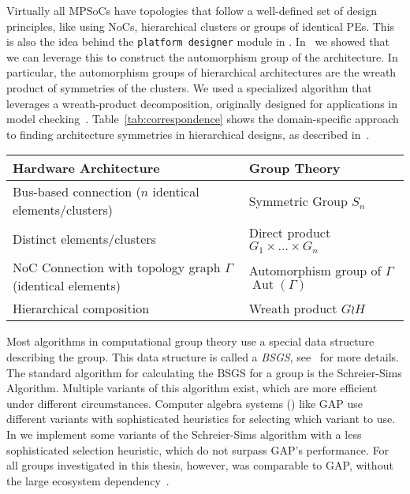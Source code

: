 Virtually all \acp{MPSoC} have topologies that follow a well-defined set of design principles, like using \acp{NoC}, hierarchical clusters or groups of identical \acp{PE}.
This is also the idea behind the \texttt{platform designer} module in \mocasin.
In~\cite{goens_tcad21} we showed that we can leverage this to construct the automorphism group of the architecture.
In particular, the automorphism groups of hierarchical architectures are the wreath product of symmetries of the clusters.
We used a specialized algorithm that leverages a wreath-product decomposition, originally designed for applications in model checking~\cite{donaldson2009constructive}.
Table~\ref{tab:correspondence} shows the domain-specific approach to finding architecture symmetries in hierarchical designs, as described in~\cite{goens_tcad21}.

\begin{table*}[t]
   \caption{Correspondence of architecture and group-theoretic constructions. Adapted from Table~1 in~\cite{goens_tcad21}.}
     \label{tab:correspondence}
   \begin{center}
     \begin{tabularx}{\textwidth}{XX}
       Hardware Architecture & Group Theory \\
       \hline
       \rowcolor{gray!15}
       Bus-based connection ($n$ identical elements/clusters) & Symmetric Group $S_n$ \\
       Distinct elements/clusters & Direct product $G_1 \times \ldots \times G_n$ \\
       \rowcolor{gray!15}
       \ac{NoC} Connection with topology graph $\Gamma$ (identical elements) & Automorphism group of $\Gamma$  $\operatorname{Aut}(\Gamma)$  \\
       Hierarchical composition & Wreath product $G \wr H$ \\
     \end{tabularx}
   \end{center}
   \vspace{-0.5cm}
 \end{table*}
 
Most algorithms in computational group theory use a special data structure describing the group.
This data structure is called a \emph{\ac{BSGS}}, see~\cite{holt,seress2003permutation} for more details.
The standard algorithm for calculating the \ac{BSGS} for a group is the Schreier-Sims Algorithm.
Multiple variants of this algorithm exist, which are more efficient under different circumstances.
Computer algebra systems () like \ac{GAP} use different variants with sophisticated heuristics for selecting which variant to use.
In \mpsym we implement some variants of the Schreier-Sims algorithm with a less sophisticated selection heuristic, which do not surpass \ac{GAP}'s performance.
For all groups investigated in this thesis, however, \mpsym was comparable to \ac{GAP}, without the large ecosystem dependency~\cite{nicolai_studienarbeit,goens_tcad21}.

